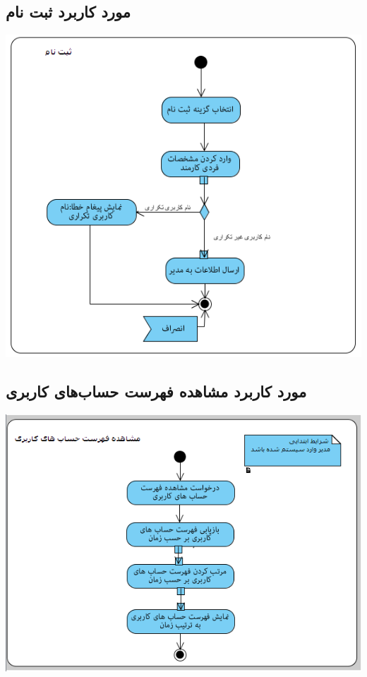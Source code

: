 \documentclass{article}
\begin{document}
\subsection*{مورد کاربرد ثبت نام}
\vspace{2cm}
\begin{center}
\includegraphics[width=\textwidth]{ActivityDiagrams/1.png}
\end{center}

\newpage
\vspace{2cm}
\subsection*{مورد کاربرد مشاهده فهرست حساب‌های کاربری}
\vspace{2cm}
\begin{center}
\includegraphics[width=\textwidth]{ActivityDiagrams/2.png}
\end{center}
\end{document}
